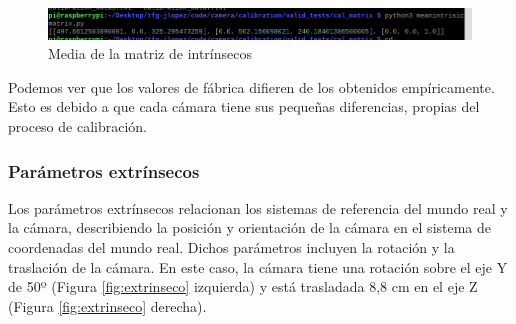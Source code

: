  \begin{figure} [h!]
	\begin{center}
		\includegraphics[width=15cm]{figs/cap6/intrinsicmedia.png}
	\end{center}
	\caption{Media de la matriz de intrínsecos}
	\label{fig:meanintrinseco}
\end{figure}


Podemos ver que los valores de fábrica difieren de los obtenidos empíricamente. Esto es debido a que cada cámara tiene sus pequeñas diferencias, propias del proceso de calibración.


\subsubsection{Parámetros extrínsecos}
\label{subsubsec:extrinsecoscamara}

Los parámetros extrínsecos relacionan los sistemas de referencia del mundo real y la cámara, describiendo la posición y orientación de la cámara en el sistema de coordenadas del mundo real. Dichos parámetros incluyen la rotación y la traslación de la cámara. En este caso, la cámara tiene una rotación sobre el eje Y de 50º (Figura \ref{fig:extrinseco} izquierda) y está trasladada 8,8 cm en el eje Z (Figura \ref{fig:extrinseco} derecha). 

